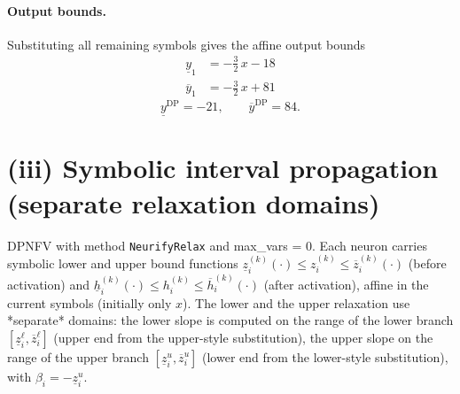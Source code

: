 \documentclass[11pt]{article}
\begin{document}
\paragraph{Output bounds.}
Substituting all remaining symbols gives the affine output bounds
\begin{align*}
\underline{y}_{1} &= -\frac{3}{2}\,x - 18
\end{align*}
\begin{align*}
\overline{y}_{1} &= -\frac{3}{2}\,x + 81
\end{align*}
\begin{equation*}
\underline{y}^{\text{DP}} = -21, \qquad \overline{y}^{\text{DP}} = 84.
\end{equation*}

\section{(iii) Symbolic interval propagation (separate relaxation domains)}
DPNFV with method \texttt{NeurifyRelax} and max\_vars = 0. Each neuron carries symbolic lower and upper bound functions
$\underline{z}^{(k)}_i(\cdot) \le z^{(k)}_i \le \overline{z}^{(k)}_i(\cdot)$ (before activation)
and $\underline{h}^{(k)}_i(\cdot) \le h^{(k)}_i \le \overline{h}^{(k)}_i(\cdot)$ (after activation),
affine in the current symbols (initially only $x$).
The lower and the upper relaxation use *separate* domains:
the lower slope is computed on the range of the lower branch
$[\underline{z}^{\ell}_i, \overline{z}^{\ell}_i]$ (upper end from the upper-style substitution),
the upper slope on the range of the upper branch
$[\underline{z}^{u}_i, \overline{z}^{u}_i]$ (lower end from the lower-style substitution),
with $\beta_i = -\underline{z}^{u}_i$.
\end{document}
